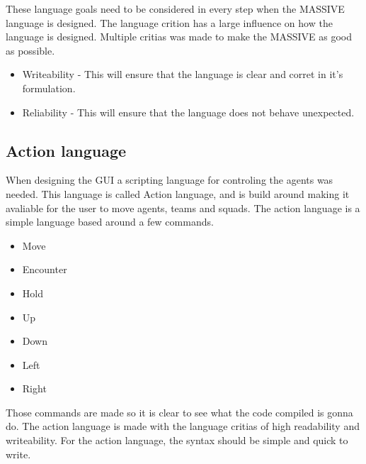 These language goals need to be considered in every step when the MASSIVE language is designed.
The language crition has a large influence on how the language is designed. Multiple critias was made to make the MASSIVE as good as possible.

\begin{itemize}
	\item Writeability - This will ensure that the language is clear and corret in it's formulation.
	\item Reliability - This will ensure that the language does not behave unexpected.
\end{itemize}

\subsection{Action language}
When designing the GUI a scripting language for controling the agents was needed. This language is called Action language, and is build around making it avaliable for the user to move agents, teams and squads.
The action language is a simple language based around a few commands.

\begin{itemize}
	\item Move
	\item Encounter
	\item Hold
	\item Up
	\item Down
	\item Left
	\item Right
\end{itemize}

Those commands are made so it is clear to see what the code compiled is gonna do. The action language is made with the language critias of high readability and writeability. For the action language, the syntax should be simple and quick to write.